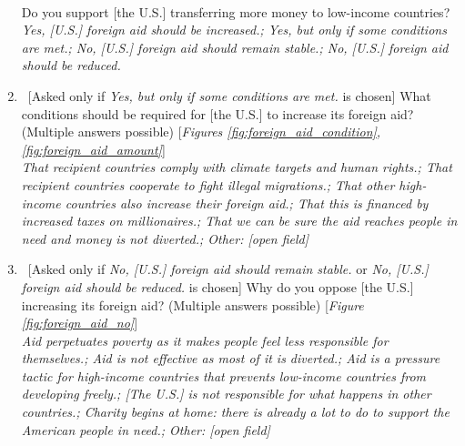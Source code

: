 \documentclass[12pt,english]{article}
\begin{document}
\begin{enumerate}[resume]
\\
Do you support [the U.S.] transferring more money to low-income countries?
\\ \textit{Yes, [U.S.] foreign aid should be increased.; Yes, but only if some conditions are met.; No, [U.S.] foreign aid should remain stable.; No, [U.S.] foreign aid should be reduced.}
\item ~[Asked only if \textit{Yes, but only if some conditions are met.} is chosen] \label{q:foreign_aid_condition} What conditions should be required for [the U.S.] to increase its foreign aid? (Multiple answers possible) [\textit{Figures \ref{fig:foreign_aid_condition}, \ref{fig:foreign_aid_amount}}]
\\ \textit{That recipient countries comply with climate targets and human rights.; That recipient countries cooperate to fight illegal migrations.; That other high-income countries also increase their foreign aid.; That this is financed by increased taxes on millionaires.; That we can be sure the aid reaches people in need and money is not diverted.; Other: [open field]}
\item ~[Asked only if \textit{No, [U.S.] foreign aid should remain stable.} or \textit{No, [U.S.] foreign aid should be reduced.} is chosen] \label{q:foreign_aid_no} Why do you oppose [the U.S.] increasing its foreign aid? (Multiple answers possible) [\textit{Figure \ref{fig:foreign_aid_no}}]
\\ \textit{Aid perpetuates poverty as it makes people feel less responsible for themselves.; Aid is not effective as most of it is diverted.; Aid is a pressure tactic for high-income countries that prevents low-income countries from developing freely.; [The U.S.] is not responsible for what happens in other countries.; Charity begins at home: there is already a lot to do to support the American people in need.; Other: [open field]}
\end{enumerate}
\end{document}
